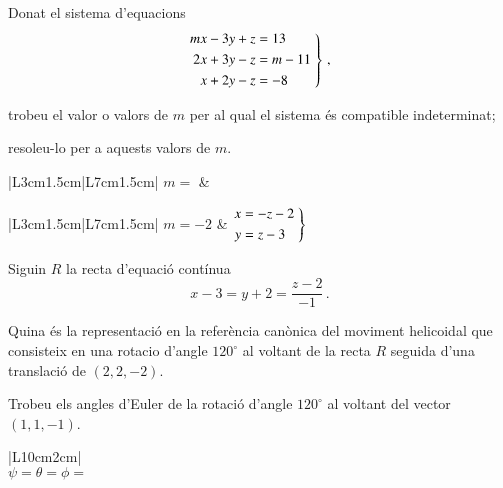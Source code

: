 \documentclass[10pt,catalan]{article}
\begin{document}
\begin{enunciat}
Donat el sistema d'equacions
\[
  \left.\aligned m x - 3 y + z &= 13 \\ 2 x + 3 y - z &= m - 11 \\ x + 2 y - z &= -8 \endaligned\;\right\}\,,
\]
\begin{apartats}
\item trobeu el valor o valors de $m$ per al qual el sistema és compatible indeterminat;
\item resoleu-lo per a aquests valors de $m$.
\end{apartats}
\end{enunciat}

\begin{quadricula}
\begin{tabular}{|L{3cm}{1.5cm}|L{7cm}{1.5cm}|}
\hline
$m=$ & \\
\hline
\end{tabular}
\end{quadricula}

\begin{solucio}
\begin{center}
\begin{tabular}{|L{3cm}{1.5cm}|L{7cm}{1.5cm}|}
\hline
$m=-2$ & $\left.\aligned x &= - z -2 \\ y &= z -3 \endaligned\;\right\}$\\
\hline
\end{tabular}
\end{center}
\end{solucio}





\begin{enunciat}
Siguin $R$ la recta d'equació contínua
\[
  x - 3 = y + 2 = \frac{z - 2}{-1}\,.
\]
\begin{apartats}
\item Quina és la representació en la referència canònica del moviment helicoidal que consisteix en una rotacio d'angle $120^\circ$ al voltant de la recta $R$ seguida d'una translació de $(2,2,-2)$.
\item Trobeu els angles d'Euler de la rotació d'angle $120^\circ$ al voltant del vector $(1,1,-1)$.
\end{apartats}
\end{enunciat}

\begin{quadricula}
\begin{tabular}{|L{10cm}{2cm}|}
\hline
  \\
\hline
{}
{$\psi=$\hspace{3.5cm}$\theta=$\hspace{3.5cm}$\phi=$\hspace{3.5cm}} \\
\hline
\end{tabular}
\end{quadricula}
\end{document}
